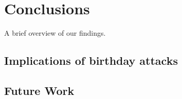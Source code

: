 \section{Conclusions}
A brief overview of our findings.

\subsection{Implications of birthday attacks}

\subsection{Future Work}

